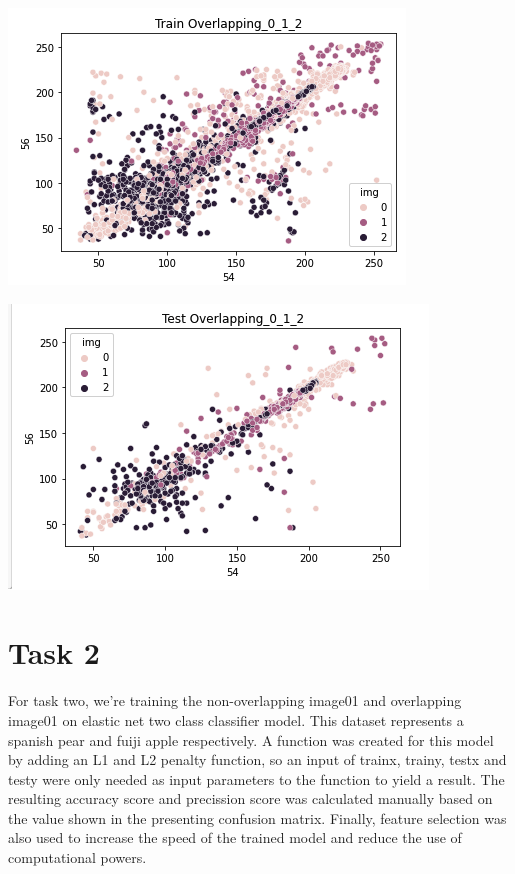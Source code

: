 \documentclass[12pt]{article}
\begin{document}
\begin{multicols*}{2}
\begin{center}
		\includegraphics[scale=0.3]{../screenshot/train_scatter_012.png}

		\includegraphics[scale=0.3]{../screenshot/test_scatter_012.png}
	\end{center}

  \section{Task 2}
  \hspace*{5mm}For task two, we're training the non-overlapping image01 and overlapping image01 on
  elastic net two class classifier model. This dataset represents a spanish pear and fuiji apple respectively.
  A function was created for this model by adding an L1 and L2 penalty function, so an input
  of trainx, trainy, testx and testy were only needed as input parameters to the function to
  yield a result. The resulting accuracy score and precission score was calculated manually based on the value shown
  in the presenting confusion matrix. Finally, feature selection was also used to increase the speed of the trained model
  and reduce the use of computational powers. 


\end{multicols*}
\end{document}
